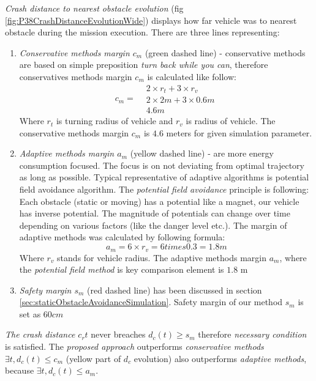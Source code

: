 \noindent \emph{Crash distance to nearest obstacle evolution} (fig \ref{fig:P38CrashDistanceEvolutionWide}) displays how far vehicle was to nearest obstacle during the mission execution. There are three lines representing:
\begin{enumerate}
    \item\emph{Conservative methods margin $c_m$} (green dashed line) - conservative methods are based on simple preposition \emph{turn back while you can}, therefore conservatives methods margin $c_m$ is calculated like follow:
    \begin{equation}
        c_m = 
        \begin{aligned}
            &2\times r_t + 3 \times r_v\\
            &2 \times 2m + 3\times 0.6m\\
            &4.6m
        \end{aligned}
    \end{equation}
    \noindent Where $r_t$ is turning radius of vehicle and $r_v$ is radius of vehicle. The conservative methods margin $c_m$ is $4.6$ meters for given simulation parameter. 
    
    \item\emph{Adaptive methods margin $a_m$} (yellow dashed line) - are more energy consumption focused. The focus is on not deviating from optimal trajectory as long as possible. Typical representative of adaptive algorithms is potential field avoidance algorithm. The \emph{potential field avoidance} principle is following: Each  obstacle (static or moving) has a potential like a magnet, our vehicle has inverse potential. The magnitude of potentials can change over time depending on various factors (like the danger level etc.). The margin of adaptive methods was calculated by following formula:
    \begin{equation}
        a_m = 6 \times r_v = 6 times 0.3 = 1.8 m
    \end{equation}
    \noindent Where $r_v$ stands for vehicle radius. The adaptive methods margin $a_m$, where the \emph{potential field method} is key comparison element is $1.8$ m
    
    \item\emph{Safety margin $s_m$} (red dashed line) has been discussed in section \ref{sec:staticObstacleAvoidanceSimulation}. Safety margin of our method $s_m$ is set as $60 cm$
\end{enumerate}

\noindent\emph{The crash distance $c_r{t}$} never breaches $d_c(t) \ge s_m$ therefore \emph{necessary condition} is satisfied. The \emph{proposed approach} outperforms \emph{conservative methods} $\exists t, d_c (t) \le c_m$ (yellow part of $d_c$ evolution) also outperforms \emph{adaptive methods}, because $\exists t, d_c(t)\le a_m$.

